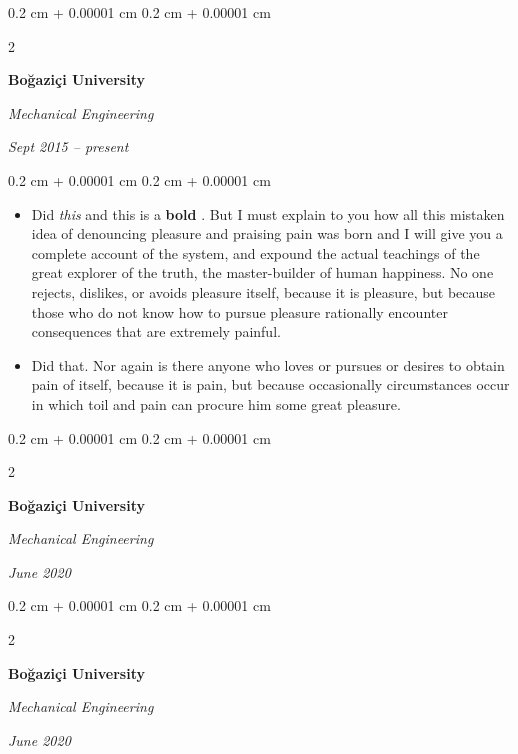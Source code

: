 \documentclass[10pt, letterpaper]{article}
\newenvironment{highlights}{
    \begin{itemize}[
        topsep=0.10 cm,
        parsep=0.10 cm,
        partopsep=0pt,
        itemsep=0pt,
        leftmargin=0.4 cm + 10pt
    ]
}{
    \end{itemize}
} %
\newenvironment{onecolentry}{
    \begin{adjustwidth}{
        0.2 cm + 0.00001 cm
    }{
        0.2 cm + 0.00001 cm
    }
}{
    \end{adjustwidth}
} %
\newenvironment{twocolentry}[2][]{
    \onecolentry
    \def\secondColumn{#2}
    \setcolumnwidth{\fill, 4.5 cm}
    \begin{paracol}{2}
}{
    \switchcolumn \raggedleft \secondColumn
    \end{paracol}
    \endonecolentry
} %
\let\hrefWithoutArrow\href
\renewcommand{\href}[2]{\hrefWithoutArrow{#1}{\ifthenelse{\equal{#2}{}}{ }{#2 }\raisebox{.15ex}{\footnotesize \faExternalLink*}}}
\begin{document}
        \vspace{0.2 cm}

        \begin{twocolentry}{
            
            
        \textit{Sept 2015 – present}}
            \textbf{Boğaziçi University}

            \textit{Mechanical Engineering}
        \end{twocolentry}

        \vspace{0.10 cm}
        \begin{onecolentry}
            \begin{highlights}
                \item Did \textit{this} and this is a \textbf{bold} \href{https://example.com}{link}. But I must explain to you how all this mistaken idea of denouncing pleasure and praising pain was born and I will give you a complete account of the system, and expound the actual teachings of the great explorer of the truth, the master-builder of human happiness. No one rejects, dislikes, or avoids pleasure itself, because it is pleasure, but because those who do not know how to pursue pleasure rationally encounter consequences that are extremely painful.
                \item Did that. Nor again is there anyone who loves or pursues or desires to obtain pain of itself, because it is pain, but because occasionally circumstances occur in which toil and pain can procure him some great pleasure.
            \end{highlights}
        \end{onecolentry}


        \vspace{0.2 cm}

        \begin{twocolentry}{
            
            
        \textit{June 2020}}
            \textbf{Boğaziçi University}

            \textit{Mechanical Engineering}
        \end{twocolentry}



        \vspace{0.2 cm}

        \begin{twocolentry}{
            
            
        \textit{June 2020}}
            \textbf{Boğaziçi University}

            \textit{Mechanical Engineering}
        \end{twocolentry}
\end{document}
